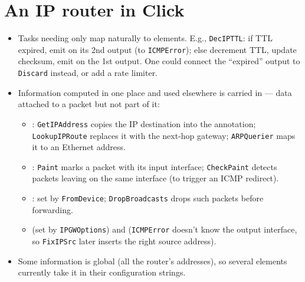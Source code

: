 \section{An IP router in Click}
\begin{itemize}
\item Tasks needing only  map naturally to elements. E.g., \texttt{DecIPTTL}: if TTL expired, emit on its 2nd output (to \texttt{ICMPError}); else decrement TTL, update checksum, emit on the 1st output. One could connect the ``expired'' output to \texttt{Discard} instead, or add a rate limiter.
\item Information computed in one place and used elsewhere is carried in  --- data attached to a packet but not part of it:
\begin{itemize}
\item {}: \texttt{GetIPAddress} copies the IP destination into the annotation; \texttt{LookupIPRoute} replaces it with the next-hop gateway; \texttt{ARPQuerier} maps it to an Ethernet address.
\item {}: \texttt{Paint} marks a packet with its input interface; \texttt{CheckPaint} detects packets leaving on the same interface (to trigger an ICMP redirect).
\item {}: set by \texttt{FromDevice}; \texttt{DropBroadcasts} drops such packets before forwarding.
\item {} (set by \texttt{IPGWOptions}) and  (\texttt{ICMPError} doesn't know the output interface, so \texttt{FixIPSrc} later inserts the right source address).
\end{itemize}
\item Some information is global (all the router's addresses), so several elements currently take it in their configuration strings.
\end{itemize}

